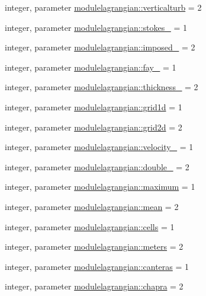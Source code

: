 \begin{DoxyCompactItemize}
\item 
integer, parameter \mbox{\hyperlink{namespacemodulelagrangian_a184500cd40a49c67488efd3e9aeb6621}{modulelagrangian\+::verticalturb}} = 2
\item 
integer, parameter \mbox{\hyperlink{namespacemodulelagrangian_a3011797e7a4d8206a22b6d1dfde9f335}{modulelagrangian\+::stokes\+\_\+}} = 1
\item 
integer, parameter \mbox{\hyperlink{namespacemodulelagrangian_a2560503c90b2d96a6ac21072b5d0c540}{modulelagrangian\+::imposed\+\_\+}} = 2
\item 
integer, parameter \mbox{\hyperlink{namespacemodulelagrangian_aad742257e00d56ef9a8edfcf2a6a709f}{modulelagrangian\+::fay\+\_\+}} = 1
\item 
integer, parameter \mbox{\hyperlink{namespacemodulelagrangian_a1af40ddd2e883571577894c77bf10fb3}{modulelagrangian\+::thickness\+\_\+}} = 2
\item 
integer, parameter \mbox{\hyperlink{namespacemodulelagrangian_af5c012e49910b7c910e0d88a63d3aa3f}{modulelagrangian\+::grid1d}} = 1
\item 
integer, parameter \mbox{\hyperlink{namespacemodulelagrangian_afd89691cefd8da9601761d5d7b6d7281}{modulelagrangian\+::grid2d}} = 2
\item 
integer, parameter \mbox{\hyperlink{namespacemodulelagrangian_a2268360ddc2ed048583c950224036ae5}{modulelagrangian\+::velocity\+\_\+}} = 1
\item 
integer, parameter \mbox{\hyperlink{namespacemodulelagrangian_a1c1e92f05b0291ba5632514a04da4c82}{modulelagrangian\+::double\+\_\+}} = 2
\item 
integer, parameter \mbox{\hyperlink{namespacemodulelagrangian_a9a8f532518f35f76544a72fa64ce818e}{modulelagrangian\+::maximum}} = 1
\item 
integer, parameter \mbox{\hyperlink{namespacemodulelagrangian_aa47f2b7ccc24276c600984e1cdc318c2}{modulelagrangian\+::mean}} = 2
\item 
integer, parameter \mbox{\hyperlink{namespacemodulelagrangian_a389b9ad184257dfd656ba77750090d62}{modulelagrangian\+::cells}} = 1
\item 
integer, parameter \mbox{\hyperlink{namespacemodulelagrangian_ab582d6869d60bcf088caba107dd31c12}{modulelagrangian\+::meters}} = 2
\item 
integer, parameter \mbox{\hyperlink{namespacemodulelagrangian_ac20a8320616d1a07662bf98257cbd0a2}{modulelagrangian\+::canteras}} = 1
\item 
integer, parameter \mbox{\hyperlink{namespacemodulelagrangian_ae2a5fc3d6ab1ade3f234f4f40989bfab}{modulelagrangian\+::chapra}} = 2

\end{DoxyCompactItemize}
